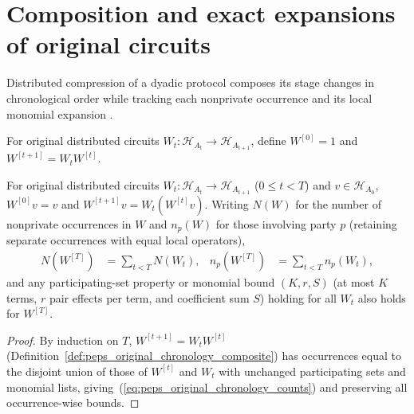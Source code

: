 \section{Composition and exact expansions of original circuits}
\label{sec:peps_original_chronology_bounds}

Distributed compression of a dyadic protocol composes its stage changes in
chronological order while tracking each nonprivate occurrence and its local
monomial expansion \cite[Proposition~7.1]{OpenAI2026PolynomialPEPS}.

\begin{definition}
    \label{def:peps_original_chronology_composite}
    \leanok
    For original distributed circuits
    $W_t:\mathcal H_{A_t}\to\mathcal H_{A_{t+1}}$, define
    $W^{[0]}=1$ and $W^{[t+1]}=W_tW^{[t]}$.
\end{definition}

\begin{lemma}
    \label{thm:peps_original_chronology_composition}
    \leanok
    For original distributed circuits $W_t:\mathcal H_{A_t}\to\mathcal H_{A_{t+1}}$
    ($0\le t<T$) and $v\in\mathcal H_{A_0}$, $W^{[0]}v=v$ and
    $W^{[t+1]}v=W_t(W^{[t]}v)$. Writing $N(W)$ for the number of nonprivate
    occurrences in $W$ and $n_p(W)$ for those involving party $p$ (retaining
    separate occurrences with equal local operators),
    \begin{align}
        N(W^{[T]})   & =\sum_{t<T}N(W_t),   &
        n_p(W^{[T]}) & =\sum_{t<T}n_p(W_t),
        \label{eq:peps_original_chronology_counts}
    \end{align}
    and any participating-set property or monomial bound $(K,r,S)$ (at most $K$
    terms, $r$ pair effects per term, and coefficient sum $S$) holding for all
    $W_t$ also holds for $W^{[T]}$.
\end{lemma}
\begin{proof}\leanok
    By induction on $T$, $W^{[t+1]}=W_tW^{[t]}$ (Definition~\ref{def:peps_original_chronology_composite})
    has occurrences equal to the disjoint union of those of $W^{[t]}$ and $W_t$
    with unchanged participating sets and monomial lists, giving~(\ref{eq:peps_original_chronology_counts})
    and preserving all occurrence-wise bounds.
\end{proof}

